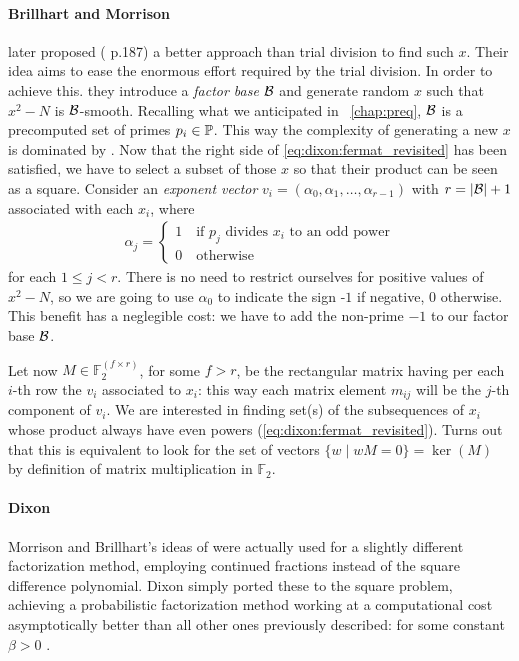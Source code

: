\paragraph{Brillhart and Morrison} later proposed (\cite{morrison-brillhart}
p.187) a better approach than trial division to find such $x$. Their idea aims
to ease the enormous effort required by the trial division. In order to achieve
this. they introduce a \emph{factor base} $\mathcal{B}$ and generate random $x$
such that $x^2 - N$ is $\mathcal{B}$-smooth. Recalling what we anticipated in
~\ref{chap:preq}, $\mathcal{B}$ is a precomputed set of primes
$p_i \in \mathbb{P}$.
This way the complexity of generating a new $x$ is dominated by
\bigO{|\factorBase|}. Now that the right side of \ref{eq:dixon:fermat_revisited}
has been satisfied, we have to select a subset of those $x$ so that their
product can be seen as a square. Consider an \emph{exponent vector}
$v_i = (\alpha_0, \alpha_1, \ldots, \alpha_{r-1})$ with $r = |\mathcal{B}| + 1$
associated with each $x_i$, where
\begin{align}
  \label{eq:dixon:alphas}
  \alpha_j = \begin{cases}
    1 \quad \text{if $p_j$ divides $x_i$ to an odd power} \\
    0 \quad \text{otherwise}
  \end{cases}
\end{align}
for each $1 \leq j < r $. There is no need to restrict ourselves for positive
values of $x^2 -N$, so we are going to use $\alpha_0$ to indicate the sign -$1$
if negative, $0$ otherwise.
This benefit has a neglegible cost: we have to add the non-prime $-1$ to our
factor base $\mathcal{B}$.

Let now $M \in \mathbb{F}_2^{(f \times r)}$,
for some $f > r$,
be the rectangular matrix having per each $i$-th row the
$v_i$ associated to $x_i$: this way each matrix element $m_{ij}$ will be the
$j$-th component of $v_i$.
We are interested in finding set(s) of the subsequences of $x_i$
whose product always have even powers (\ref{eq:dixon:fermat_revisited}).
Turns out that this is equivalent to look for the set of vectors
$\{ w \mid wM = 0 \} = \ker(M)$ by definition of matrix multiplication
in $\mathbb{F}_2$.


\paragraph{Dixon} Morrison and Brillhart's ideas of \cite{morrison-brillhart}
were actually used for a slightly different factorization method, employing
continued fractions instead of the square difference polynomial. Dixon simply
ported these to the square problem, achieving a probabilistic factorization
method working at a computational cost asymptotically better than all other ones
previously described: 
for some constant $\beta > 0$ \cite{dixon}.

